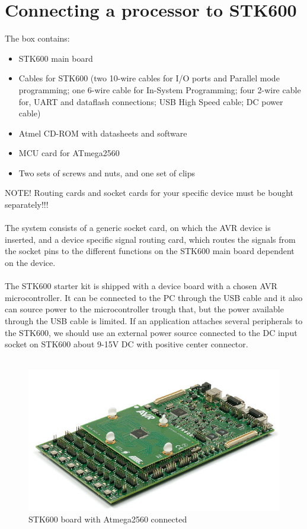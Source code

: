 \documentclass[english]{article}
\begin{document}
\section{Connecting a processor to STK600}
The box contains: 
\begin{itemize}
\item STK600 main board 
\item Cables for STK600 (two 10-wire cables for I/O ports and Parallel mode programming; one 6-wire cable for In-System Programming; four 2-wire cable for, UART and dataflash connections; USB High Speed cable; DC power cable)
\item Atmel CD-ROM with datasheets and software 
\item MCU card for ATmega2560
\item Two sets of screws and nuts, and one set of clips 
\end{itemize}
NOTE! Routing cards and socket cards for your specific device must be bought separately!!!\\\\
The system consists of a generic socket card, on which the AVR device is inserted, and a device specific signal routing card, which routes the signals from the socket pins to the different functions on the STK600 main board dependent on the device.\\\\
The STK600 starter kit is shipped with a device board with a chosen AVR microcontroller. It can be connected to the PC through the USB cable and it also can source power to the microcontroller trough that, but the power available through the USB cable is limited. If an application attaches several peripherals to the STK600, we should use an external power source connected to the DC input socket on STK600 about 9-15V DC with positive center connector.\\\\
\begin{figure}[H]
\centerline{\includegraphics[scale=0.8]{MicroLab2/image001}}
\caption{STK600 board with Atmega2560 connected}
\end{figure}
\end{document}

